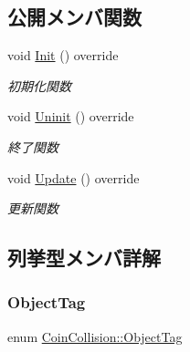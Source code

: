 \subsection*{公開メンバ関数}
\begin{DoxyCompactItemize}
\item 
void \mbox{\hyperlink{class_coin_collision_a4119a7decab2410a4ada3568ad0c132d}{Init}} () override
\begin{DoxyCompactList}\small\item\em 初期化関数 \end{DoxyCompactList}\item 
void \mbox{\hyperlink{class_coin_collision_aa852afdcdbedcf82809df9c7fd99be9e}{Uninit}} () override
\begin{DoxyCompactList}\small\item\em 終了関数 \end{DoxyCompactList}\item 
void \mbox{\hyperlink{class_coin_collision_a981fd9b1b8c688a757a456a56d80501b}{Update}} () override
\begin{DoxyCompactList}\small\item\em 更新関数 \end{DoxyCompactList}\end{DoxyCompactItemize}


\subsection{列挙型メンバ詳解}
\mbox{\label{class_coin_collision_ade7912345747f522fd895e87621ce049}} 
\subsubsection{\texorpdfstring{Object\+Tag}{ObjectTag}}
{\footnotesize\ttfamily enum \mbox{\hyperlink{class_coin_collision_ade7912345747f522fd895e87621ce049}{Coin\+Collision\+::\+Object\+Tag}}}

